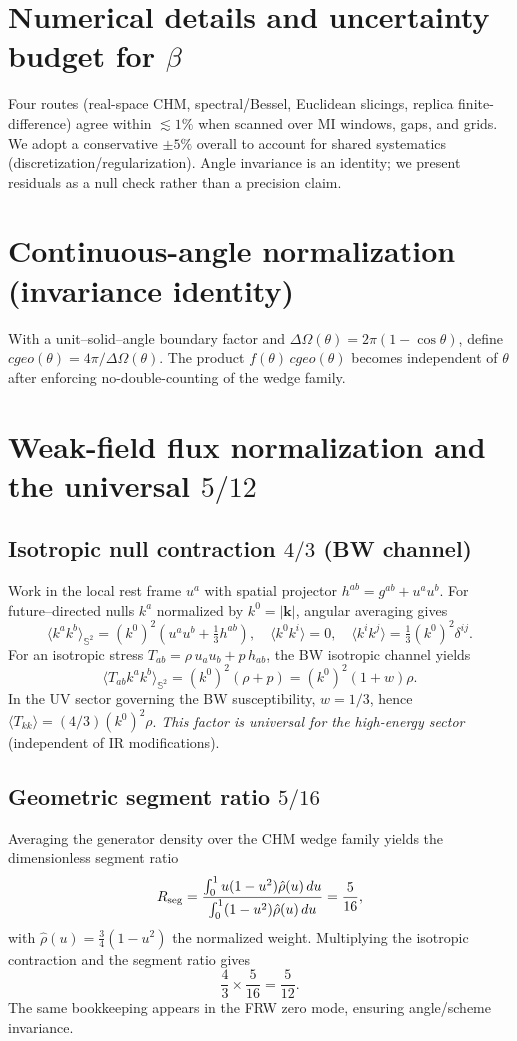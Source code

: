 \documentclass[aps,prd,onecolumn,superscriptaddress,nofootinbib]{revtex4-2}
\def\cgeo{cgeo}%
\def\Omega_\Lambda{OmegaLambda}%
\providecommand{\cgeo}{c_{\rm geo}}
\begin{document}
\section{Numerical details and uncertainty budget for \texorpdfstring{$\beta$}{beta}}
\label{app:beta}
Four routes (real-space CHM, spectral/Bessel, Euclidean slicings, replica finite-difference) agree within $\lesssim 1\%$ when scanned over MI windows, gaps, and grids. We adopt a conservative $\pm 5\%$ overall to account for shared systematics (discretization/regularization). Angle invariance is an identity; we present residuals as a null check rather than a precision claim.

\section{Continuous-angle normalization (invariance identity)}
\label{app:angle}
With a unit–solid–angle boundary factor and $\Delta\Omega(\theta)=2\pi(1-\cos\theta)$, define $\cgeo(\theta)=4\pi/\Delta\Omega(\theta)$. The product $f(\theta)\,\cgeo(\theta)$ becomes independent of $\theta$ after enforcing no-double-counting of the wedge family.

\section{Weak-field flux normalization and the universal \texorpdfstring{$5/12$}{5/12}}
\label{app:five-twelve}
\subsection*{Isotropic null contraction $4/3$ (BW channel)}
Work in the local rest frame $u^a$ with spatial projector $h^{ab}=g^{ab}+u^a u^b$. For future–directed nulls $k^a$ normalized by $k^0=|\mathbf{k}|$, angular averaging gives
\[
\big\langle k^a k^b\big\rangle_{\mathbb{S}^2}=(k^0)^2\!\left(u^a u^b+\tfrac{1}{3}h^{ab}\right),\quad
\langle k^0 k^i\rangle=0,\quad \langle k^i k^j\rangle=\tfrac{1}{3}(k^0)^2\delta^{ij}.
\]
For an isotropic stress $T_{ab}=\rho\,u_a u_b + p\,h_{ab}$, the BW isotropic channel yields
\[
\big\langle T_{ab}k^a k^b\big\rangle_{\mathbb{S}^2}=(k^0)^2(\rho+p)=(k^0)^2(1+w)\rho.
\]
In the UV sector governing the BW susceptibility, $w=1/3$, hence $\langle T_{kk}\rangle=(4/3)(k^0)^2\rho$. \textit{This factor is universal for the high-energy sector} (independent of IR modifications).

\subsection*{Geometric segment ratio $5/16$}
Averaging the generator density over the CHM wedge family yields the dimensionless segment ratio
\[
R_{\rm seg}=\frac{\int_0^1 u(1-u^2)\hat\rho(u)\,du}{\int_0^1 (1-u^2)\hat\rho(u)\,du}=\frac{5}{16},
\]
with $\hat\rho(u)=\tfrac{3}{4}(1-u^2)$ the normalized weight. Multiplying the isotropic contraction and the segment ratio gives
\[
\frac{4}{3}\times \frac{5}{16}=\frac{5}{12}.
\]
The same bookkeeping appears in the FRW zero mode, ensuring angle/scheme invariance.
\end{document}
